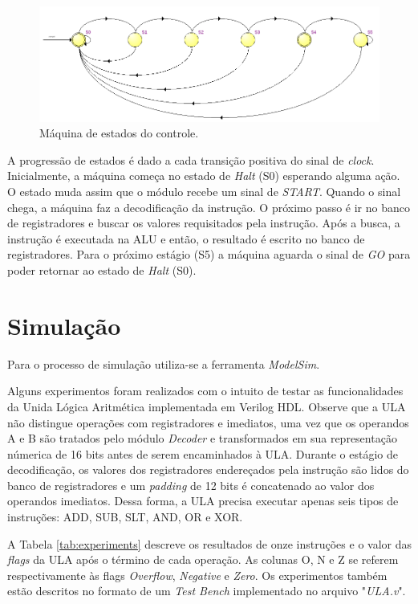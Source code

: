 \documentclass[11pt,a4paper,titlepage]{article}
\begin{document}
\begin{figure}[h]
\centering
\includegraphics[scale=0.4]{images/StateMachine.png}
\caption{Máquina de estados do controle.}
\label{fig:statemachine}
\end{figure}

A progressão de estados é dado a cada transição positiva do sinal de \textit{clock}. Inicialmente, a máquina começa no estado de \textit{Halt} (S0) esperando alguma ação. O estado muda assim que o módulo recebe um sinal de \textit{START}. Quando o sinal chega, a máquina faz a decodificação da instrução. O próximo passo é ir no banco de registradores e buscar os valores requisitados pela instrução. Após a busca, a instrução é executada na ALU e então, o resultado é escrito no banco de registradores. Para o próximo estágio (S5) a máquina aguarda o sinal de \textit{GO} para poder retornar ao estado de \textit{Halt} (S0).

\section{Simulação}

Para o processo de simulação utiliza-se a ferramenta \textit{ModelSim}.

Alguns experimentos foram realizados com o intuito de testar as funcionalidades da Unida Lógica Aritmética implementada em Verilog HDL. Observe que a ULA não distingue operações com registradores e imediatos, uma vez que os operandos A e B são tratados pelo módulo \textit{Decoder} e transformados em sua representação númerica de 16 bits antes de serem encaminhados à ULA. Durante o estágio de decodificação, os valores dos registradores endereçados pela instrução são lidos do banco de registradores e um \textit{padding} de 12 bits é concatenado ao valor dos operandos imediatos. Dessa forma, a ULA precisa executar apenas seis tipos de instruções: ADD, SUB, SLT, AND, OR e XOR.

A Tabela \ref{tab:experiments} descreve os resultados de onze  instruções e o valor das \textit{flags} da ULA após o término de cada operação. As colunas O, N e Z se referem respectivamente às flags \textit{Overflow}, \textit{Negative} e \textit{Zero}. Os experimentos também estão descritos no formato de um \textit{Test Bench} implementado no arquivo "\textit{ULA.v}".
\end{document}
